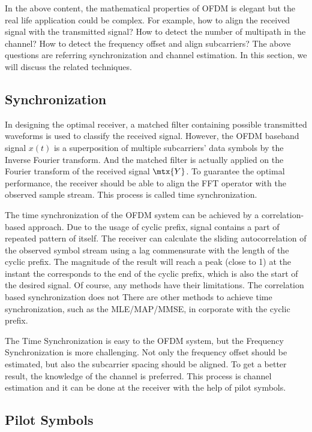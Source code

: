In the above content, the mathematical properties of OFDM is elegant but the real life application could be complex. For example, how to align the received signal with the transmitted signal? How to detect the number of multipath in the channel? How to detect the frequency offset and align subcarriers? The above questions are referring synchronization and channel estimation. In this section, we will discuss the related techniques.

\subsection{Synchronization}
In designing the optimal receiver, a matched filter containing possible transmitted waveforms is used to classify the received signal. However, the OFDM baseband signal $x(t)$ is a superposition of multiple subcarriers' data symbols by the Inverse Fourier transform. And the matched filter is actually applied on the Fourier transform of the received signal $\mtx{Y}$. To guarantee the optimal performance, the receiver should be able to align the FFT operator with the observed sample stream. This process is called time synchronization.

The time synchronization of the OFDM system can be achieved by a correlation-based approach. Due to the usage of cyclic prefix, signal contains a part of repeated pattern of itself. The receiver can calculate the sliding autocorrelation of the observed symbol stream using a lag commensurate with the length of the cyclic prefix. The magnitude of the result will reach a peak (close to 1) at the instant the corresponds to the end of the cyclic prefix, which is also the start of the desired signal. Of course, any methods have their limitations. The correlation based synchronization does not There are other methods to achieve time synchronization, such as the MLE/MAP/MMSE, \etc in corporate with the cyclic prefix.

The Time Synchronization is easy to the OFDM system, but the Frequency Synchronization is more challenging. Not only the frequency offset should be estimated, but also the subcarrier spacing should be aligned. To get a better result, the knowledge of the channel is preferred. This process is channel estimation and it can be done at the receiver with the help of pilot symbols.

\subsection{Pilot Symbols}
